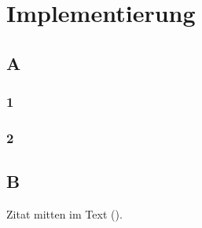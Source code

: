 \sffamily
\chapter{Implementierung}\label{cha:Implementierung}

\section{A}
\subsection{1}
\blindtext
\subsection{2}
\blindtext

\section{B}
\blindtext
Zitat mitten im Text ().